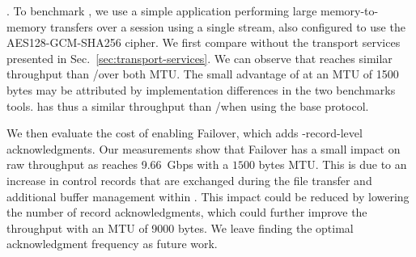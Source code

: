 \textbf{\tcpls}.  To benchmark \tcpls, we use a simple application performing
large memory-to-memory transfers over a \tcpls session using a single stream,
also
configured to use the AES128-GCM-SHA256 cipher.
We first compare \tcpls without the transport services presented in
Sec.~\ref{sec:transport-services}. We can observe that \tcpls reaches similar
throughput than \tls/\tcp over both MTU. The small advantage of \tcpls at an
MTU of 1500 bytes may be attributed by implementation differences in the two
benchmarks tools. \tcpls has thus a similar throughput than \tcp/\tls when
using the base protocol. %



We then evaluate the cost of enabling Failover, which adds \tcpls-record-level
acknowledgments. %
Our measurements show that Failover has a small impact on raw throughput as
\tcpls reaches 9.66~Gbps with a $1500$ bytes MTU. This is due to an increase in
control records that are exchanged during the file transfer and additional
buffer management within \tcpls. This impact could be reduced by lowering the
number of record acknowledgments, which could further improve the throughput
with an MTU of 9000 bytes. We leave finding the optimal acknowledgment
frequency as future work. 



